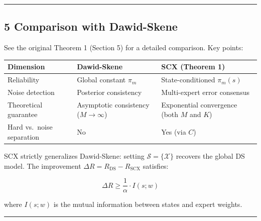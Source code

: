 \documentclass[
  12pt,
]{ctexart}
\begin{document}
\begin{center}\rule{0.5\linewidth}{0.5pt}\end{center}

\subsection{5 Comparison with
Dawid-Skene}\label{comparison-with-dawid-skene}

See the original Theorem 1 (Section 5) for a detailed comparison. Key
points:

\begin{longtable}[]{@{}
  >{\raggedright\arraybackslash}p{}
  >{\raggedright\arraybackslash}p{}
  >{\raggedright\arraybackslash}p{}@{}}
\toprule\noalign{}
\begin{minipage}[b]{\linewidth}\raggedright
Dimension
\end{minipage} & \begin{minipage}[b]{\linewidth}\raggedright
Dawid-Skene
\end{minipage} & \begin{minipage}[b]{\linewidth}\raggedright
SCX (Theorem 1)
\end{minipage} \\
\midrule\noalign{}
\endhead
\bottomrule\noalign{}
\endlastfoot
Reliability & Global constant \(\pi_m\) & State-conditioned
\(\pi_m(s)\) \\
Noise detection & Posterior consistency & Multi-expert error
consensus \\
Theoretical guarantee & Asymptotic consistency (\(M \to \infty\)) &
Exponential convergence (both \(M\) and \(K\)) \\
Hard vs.~noise separation & No & Yes (via \(C\)) \\
\end{longtable}

SCX strictly generalizes Dawid-Skene: setting
\(\mathcal{S} = \{\mathcal{X}\}\) recovers the global DS model. The
improvement \(\Delta R = R_{\text{DS}} - R_{\text{SCX}}\) satisfies:

\[\Delta R \geq \frac{1}{\alpha} \cdot I(s; w)\]

where \(I(s; w)\) is the mutual information between states and expert
weights.

\begin{center}\rule{0.5\linewidth}{0.5pt}\end{center}
\end{document}
